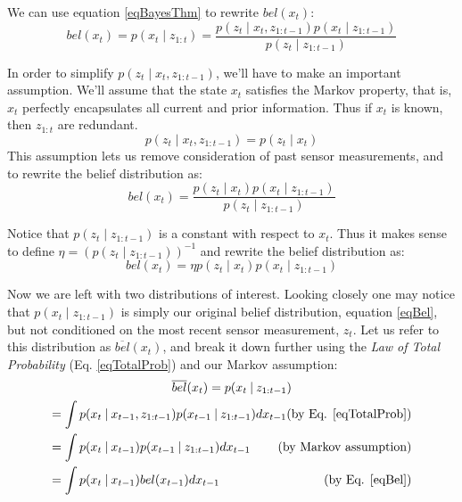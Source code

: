 We can use equation \ref{eqBayesThm} to rewrite \(bel(x_t)\):
\begin{equation*}
bel(x_t) = p(x_t \mathbin{\vert} z_{1:t}) = \frac{p(z_t \mathbin{\vert} x_t, z_{1:t-1})p(x_t \mathbin{\vert} z_{1:t-1})}{p(z_t \mathbin{\vert} z_{1:t-1})}
\end{equation*}

In order to simplify \(p(z_t \mathbin{\vert} x_t, z_{1:t-1})\), we'll have to make an important assumption. We'll assume that the state \(x_t\) satisfies the Markov property, that is, \(x_t\) perfectly encapsulates all current and prior information. Thus if \(x_t\) is known, then \(z_{1:t}\) are redundant.
\begin{equation*}
p(z_t \mathbin{\vert} x_t, z_{1:t-1}) = p(z_t \mathbin{\vert} x_t)
\end{equation*}
This assumption lets us remove consideration of past sensor measurements, and to rewrite the belief distribution as:
\begin{equation*}
bel(x_t) = \frac{p(z_t \mathbin{\vert} x_t)p(x_t \mathbin{\vert} z_{1:t-1})}{p(z_t \mathbin{\vert} z_{1:t-1})}
\end{equation*}

Notice that \(p(z_t \mathbin{\vert} z_{1:t-1})\) is a constant with respect to \(x_t\). Thus it makes sense to define \(\eta = (p(z_t \mathbin{\vert} z_{1:t-1}))^{-1}\) and rewrite the belief distribution as:
\begin{equation*}
bel(x_t) = \eta p(z_t \mathbin{\vert} x_t) p(x_t \mathbin{\vert} z_{1:t-1})
\end{equation*}

Now we are left with two distributions of interest. Looking closely one may notice that \(p(x_t \mathbin{\vert} z_{1:t-1})\) is simply our original belief distribution, equation \ref{eqBel}, but not conditioned on the most recent sensor measurement, \(z_t\). Let us refer to this distribution as \(\overline{bel}(x_t)\), and break it down further using the \textit{Law of Total Probability} (Eq. \ref{eqTotalProb}) and our Markov assumption:
\begin{multline*}
\overline{bel}(x_t) = p(x_t \mathbin{\vert} z_{1:t-1}) \\
= \int p(x_t \mathbin{\vert} x_{t-1}, z_{1:t-1}) p(x_{t-1} \mathbin{\vert} z_{1:t-1})dx_{t-1} \hfill \text{(by Eq. \ref{eqTotalProb})}\\
= \int p(x_t \mathbin{\vert} x_{t-1}) p(x_{t-1} \mathbin{\vert} z_{1:t-1})dx_{t-1} \hfill \text{  (by Markov assumption)} \\
= \int p(x_t \mathbin{\vert} x_{t-1}) bel(x_{t-1})dx_{t-1}  \hfill \text{(by Eq. \ref{eqBel})}
\end{multline*}

